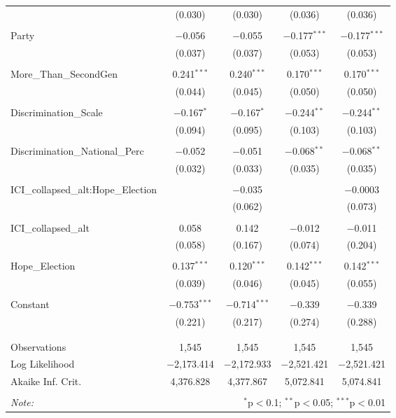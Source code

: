 \begin{table}[!htbp]
\begin{tabular}{@{\extracolsep{5pt}}lcccc}
  & (0.030) & (0.030) & (0.036) & (0.036) \\ 
  & & & & \\ 
 Party & $-$0.056 & $-$0.055 & $-$0.177$^{***}$ & $-$0.177$^{***}$ \\ 
  & (0.037) & (0.037) & (0.053) & (0.053) \\ 
  & & & & \\ 
 More\_Than\_SecondGen & 0.241$^{***}$ & 0.240$^{***}$ & 0.170$^{***}$ & 0.170$^{***}$ \\ 
  & (0.044) & (0.045) & (0.050) & (0.050) \\ 
  & & & & \\ 
 Discrimination\_Scale & $-$0.167$^{*}$ & $-$0.167$^{*}$ & $-$0.244$^{**}$ & $-$0.244$^{**}$ \\ 
  & (0.094) & (0.095) & (0.103) & (0.103) \\ 
  & & & & \\ 
 Discrimination\_National\_Perc & $-$0.052 & $-$0.051 & $-$0.068$^{**}$ & $-$0.068$^{**}$ \\ 
  & (0.032) & (0.033) & (0.035) & (0.035) \\ 
  & & & & \\ 
 ICI\_collapsed\_alt:Hope\_Election &  & $-$0.035 &  & $-$0.0003 \\ 
  &  & (0.062) &  & (0.073) \\ 
  & & & & \\ 
 ICI\_collapsed\_alt & 0.058 & 0.142 & $-$0.012 & $-$0.011 \\ 
  & (0.058) & (0.167) & (0.074) & (0.204) \\ 
  & & & & \\ 
 Hope\_Election & 0.137$^{***}$ & 0.120$^{***}$ & 0.142$^{***}$ & 0.142$^{***}$ \\ 
  & (0.039) & (0.046) & (0.045) & (0.055) \\ 
  & & & & \\ 
 Constant & $-$0.753$^{***}$ & $-$0.714$^{***}$ & $-$0.339 & $-$0.339 \\ 
  & (0.221) & (0.217) & (0.274) & (0.288) \\ 
  & & & & \\ 
\hline \\[-1.8ex] 
Observations & 1,545 & 1,545 & 1,545 & 1,545 \\ 
Log Likelihood & $-$2,173.414 & $-$2,172.933 & $-$2,521.421 & $-$2,521.421 \\ 
Akaike Inf. Crit. & 4,376.828 & 4,377.867 & 5,072.841 & 5,074.841 \\ 
\hline 
\hline \\[-1.8ex] 
\textit{Note:}  & \multicolumn{4}{r}{$^{*}$p$<$0.1; $^{**}$p$<$0.05; $^{***}$p$<$0.01} \\ 
\end{tabular} 
\end{table} 
